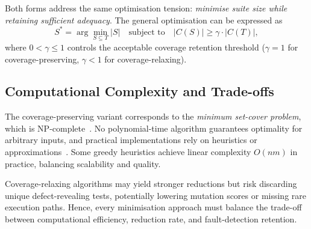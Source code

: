 Both forms address the same optimisation tension: \emph{minimise suite size while retaining sufficient adequacy}.  
The general optimisation can be expressed as
\[
S^* = \arg\min_{S \subseteq T} |S|
\quad \text{subject to} \quad
|C(S)| \ge \gamma \cdot |C(T)|,
\]
where \(0 < \gamma \le 1\) controls the acceptable coverage retention threshold (\(\gamma=1\) for coverage-preserving, \(\gamma<1\) for coverage-relaxing).

\subsection{Computational Complexity and Trade-offs}

The coverage-preserving variant corresponds to the \emph{minimum set-cover problem}, which is NP-complete~\cite{yoo2012}.  
No polynomial-time algorithm guarantees optimality for arbitrary inputs, and practical implementations rely on heuristics or approximations~\cite{harrold1993,chvatal1979}.  
Some greedy heuristics achieve linear complexity \(O(nm)\) in practice, balancing scalability and quality.

Coverage-relaxing algorithms may yield stronger reductions but risk discarding unique defect-revealing tests, potentially lowering mutation scores or missing rare execution paths.  
Hence, every minimisation approach must balance the trade-off between computational efficiency, reduction rate, and fault-detection retention.

